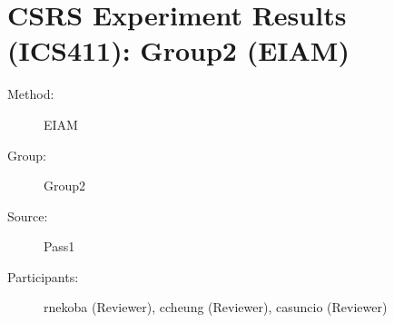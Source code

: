 \chapter {CSRS Experiment Results (ICS411): Group2 (EIAM)}
\small

\begin{description}
\item [Method:] EIAM
\item [Group:] Group2
\item [Source:] Pass1
\item [Participants:] rnekoba (Reviewer), ccheung (Reviewer), casuncio (Reviewer)
\end{description}

